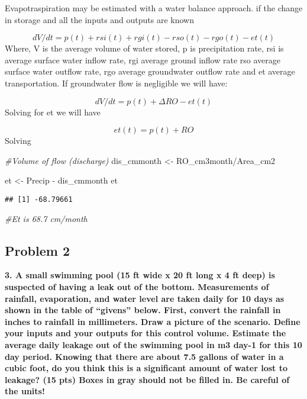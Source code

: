 \documentclass[
]{article}
\newenvironment{Shaded}{\begin{snugshade}}{\end{snugshade}}
\newcommand{\CommentTok}[1]{\textcolor[rgb]{0.56,0.35,0.01}{\textit{#1}}}
\newcommand{\NormalTok}[1]{#1}
\newcommand{\OtherTok}[1]{\textcolor[rgb]{0.56,0.35,0.01}{#1}}
\newcommand{\SpecialCharTok}[1]{\textcolor[rgb]{0.00,0.00,0.00}{#1}}
\begin{document}
Evapotraspiration may be estimated with a water balance approach. if the
change in storage and all the inputs and outputs are known

\[ dV/dt = p(t) + rsi(t) + rgi(t) - rso(t) - rgo(t) - et(t)\] Where, V
is the average volume of water stored, p is precipitation rate, rsi is
average surface water inflow rate, rgi average ground inflow rate rso
average surface water outflow rate, rgo average groundwater outflow rate
and et average transportation. If groundwater flow is negligible we will
have:

\[ dV/dt = p(t) + ΔRO- et(t) \] Solving for et we will have

\[ et(t) = p(t) + RO \] Solving

\begin{Shaded}
\begin{Highlighting}[]
\CommentTok{\#Volume of flow (discharge) }
\NormalTok{dis\_cmmonth }\OtherTok{\textless{}{-}}\NormalTok{ RO\_cm3month}\SpecialCharTok{/}\NormalTok{Area\_cm2}

\NormalTok{et }\OtherTok{\textless{}{-}}\NormalTok{ Precip }\SpecialCharTok{{-}}\NormalTok{ dis\_cmmonth }
\NormalTok{et }
\end{Highlighting}
\end{Shaded}

\begin{verbatim}
## [1] -68.79661
\end{verbatim}

\begin{Shaded}
\begin{Highlighting}[]
\CommentTok{\#Et is 68.7 cm/month}
\end{Highlighting}
\end{Shaded}

\hypertarget{problem-2}{%
\subsection{Problem 2}\label{problem-2}}

\textbf{3. A small swimming pool (15 ft wide x 20 ft long x 4 ft deep)
is suspected of having a leak out of the bottom. Measurements of
rainfall, evaporation, and water level are taken daily for 10 days as
shown in the table of ``givens'' below. First, convert the rainfall in
inches to rainfall in millimeters. Draw a picture of the scenario.
Define your inputs and your outputs for this control volume. Estimate
the average daily leakage out of the swimming pool in m3 day-1 for this
10 day period. Knowing that there are about 7.5 gallons of water in a
cubic foot, do you think this is a significant amount of water lost to
leakage? (15 pts) Boxes in gray should not be filled in. Be careful of
the units!}
\end{document}
